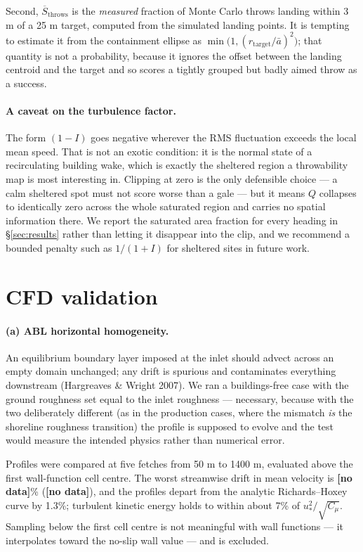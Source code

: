 \documentclass[11pt,letterpaper]{article}
\newcommand{\MISSINGNUM}{\textbf{\color{red}[no data]}}%
\newcommand{\ABLdrift}{\MISSINGNUM}\newcommand{\ABLverdict}{\MISSINGNUM}%
\begin{document}
Second, $\overline{S}_{\text{throws}}$ is the \emph{measured} fraction of Monte
Carlo throws landing within 3 m of a 25 m target, computed from the simulated
landing points. It is tempting to estimate it from the containment ellipse as
$\min\!\big(1, (r_{\text{target}}/\bar a)^2\big)$; that quantity is not a
probability, because it ignores the offset between the landing centroid and the
target and so scores a tightly grouped but badly aimed throw as a success.

\paragraph{A caveat on the turbulence factor.} The form $(1 - I)$ goes negative
wherever the RMS fluctuation exceeds the local mean speed. That is not an exotic
condition: it is the normal state of a recirculating building wake, which is
exactly the sheltered region a throwability map is most interesting in.
Clipping at zero is the only defensible choice --- a calm sheltered spot must
not score worse than a gale --- but it means $Q$ collapses to identically zero
across the whole saturated region and carries no spatial information there. We
report the saturated area fraction for every heading in \S\ref{sec:results}
rather than letting it disappear into the clip, and we recommend a bounded
penalty such as $1/(1+I)$ for sheltered sites in future work.

\section{CFD validation}
\label{sec:cfdvalid}

\paragraph{(a) ABL horizontal homogeneity.} An equilibrium boundary layer
imposed at the inlet should advect across an empty domain unchanged; any drift
is spurious and contaminates everything downstream (Hargreaves \& Wright 2007).
We ran a buildings-free case with the ground roughness set equal to the inlet
roughness --- necessary, because with the two deliberately different (as in the
production cases, where the mismatch \emph{is} the shoreline roughness
transition) the profile is supposed to evolve and the test would measure the
intended physics rather than numerical error.

Profiles were compared at five fetches from 50 m to 1400 m, evaluated above the
first wall-function cell centre. The worst streamwise drift in mean velocity is
\ABLdrift\% (\ABLverdict), and the profiles depart from the analytic
Richards--Hoxey curve by 1.3\%; turbulent kinetic energy holds to within about
7\% of $u_*^2/\sqrt{C_\mu}$. Sampling below the first cell centre is not
meaningful with wall functions --- it interpolates toward the no-slip wall
value --- and is excluded.
\end{document}

